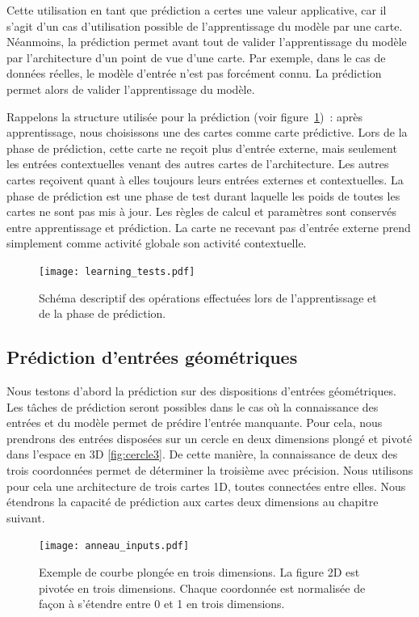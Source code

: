 \documentclass[../main]{subfiles}
\begin{document}
Cette utilisation en tant que prédiction a certes une valeur applicative, car il s'agit d'un cas d'utilisation possible de l'apprentissage du modèle par une carte. Néanmoins, la prédiction permet avant tout de valider l'apprentissage du modèle par l'architecture d'un point de vue d'une carte. Par exemple, dans le cas de données réelles, le modèle d'entrée n'est pas forcément connu. La prédiction permet alors de valider l'apprentissage du modèle.

Rappelons la structure utilisée pour la prédiction (voir figure~\ref{fig:schema_pred})~: après apprentissage, nous choisissons une des cartes comme carte prédictive. Lors de la phase de prédiction, cette carte ne reçoit plus d'entrée externe, mais seulement les entrées contextuelles venant des autres cartes de l'architecture. 
Les autres cartes reçoivent quant à elles toujours leurs entrées externes et contextuelles. La phase de prédiction est une phase de test durant laquelle les poids de toutes les cartes ne sont pas mis à jour. Les règles de calcul et paramètres sont conservés entre apprentissage et prédiction. La carte ne recevant pas d'entrée externe prend simplement comme activité globale son activité contextuelle.

\begin{figure}
	\texttt{[image: learning\_tests.pdf]}
	\caption{Schéma descriptif des opérations effectuées lors de l'apprentissage et de la phase de prédiction.\label{fig:schema_pred}}
\end{figure}


\subsection{Prédiction d'entrées géométriques}

Nous testons d'abord la prédiction sur des dispositions d'entrées géométriques.
Les tâches de prédiction seront possibles dans le cas où la connaissance des entrées et du modèle permet de prédire l'entrée manquante.
Pour cela, nous prendrons des entrées disposées sur un cercle en deux dimensions plongé et pivoté dans l'espace en 3D \ref{fig:cercle3}. De cette manière, la connaissance de deux des trois coordonnées permet de déterminer la troisième avec précision.
Nous utilisons pour cela une architecture de trois cartes 1D, toutes connectées entre elles.
Nous étendrons la capacité de prédiction aux cartes deux dimensions au chapitre suivant.

\begin{figure}
	\centering\texttt{[image: anneau\_inputs.pdf]}
	\caption{Exemple de courbe plongée en trois dimensions. La figure 2D est pivotée en trois dimensions. Chaque coordonnée est normalisée de façon à s'étendre entre 0 et 1 en trois dimensions.
	\label{fig:in_3D}}
\end{figure}
\end{document}
